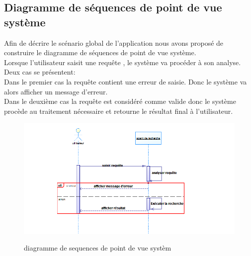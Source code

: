         \subsection{Diagramme de séquences de point de vue système}
        Afin de décrire le scénario global de l'application nous avons proposé de construire le diagramme de séquences de point de vue système.\\
        Lorsque l'utilisateur saisit une requête , le système va procéder à son analyse. Deux cas se présentent:\\
        Dans le premier cas la requête contient une erreur de saisie. Donc le système va alors afficher un message d'erreur.\\
        Dans le deuxième  cas la requête est considéré comme valide donc le système procède au traitement nécessaire et retourne le résultat final à l'utilisateur.\\
        \begin{figure}[H]
                    \centering
                    \includegraphics[width=20cm]{diagramme_sequence_system}\\
                    \caption{diagramme de sequences de point de vue systèm}\label{diagramme sequence system}
        \end{figure}

